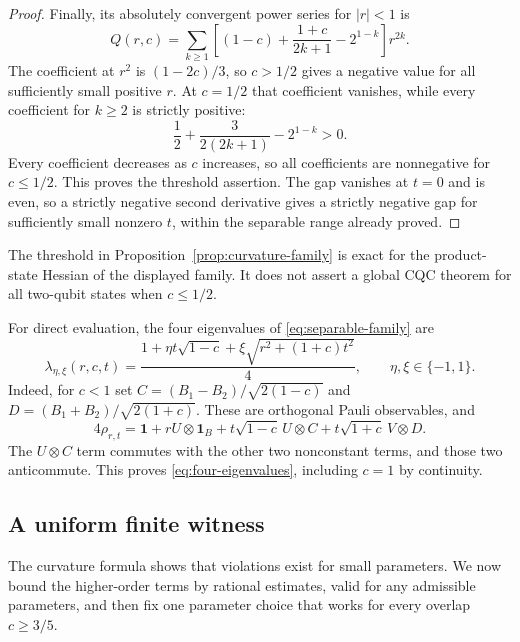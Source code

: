 \begin{proof}
 Finally, its absolutely convergent power series for $|r|<1$ is
 \begin{equation}
  Q(r,c)=\sum_{k\geq1}
   \left[(1-c)+\frac{1+c}{2k+1}-2^{1-k}\right]r^{2k}.
  \label{eq:curvature-series}
 \end{equation}
 The coefficient at $r^2$ is $(1-2c)/3$, so $c>1/2$ gives a negative
 value for all sufficiently small positive $r$.  At $c=1/2$ that
 coefficient vanishes, while every coefficient for $k\geq2$ is
 strictly positive:
 \[
  \frac12+\frac{3}{2(2k+1)}-2^{1-k}>0.
 \]
 Every coefficient decreases as $c$ increases, so all coefficients
 are nonnegative for $c\leq1/2$.  This proves the threshold assertion.
 The gap vanishes at $t=0$ and is even, so a strictly negative second
 derivative gives a strictly negative gap for sufficiently small
 nonzero $t$, within the separable range already proved.
\end{proof}

The threshold in Proposition~\ref{prop:curvature-family} is exact for
the product-state Hessian of the displayed family.  It does not assert
a global CQC theorem for all two-qubit states when $c\leq1/2$.

For direct evaluation, the four eigenvalues of
\eqref{eq:separable-family} are
\begin{equation}
 \lambda_{\eta,\xi}(r,c,t)
 =\frac{1+\eta t\sqrt{1-c}
             +\xi\sqrt{r^2+(1+c)t^2}}4,
 \qquad\eta,\xi\in\{-1,1\}.
 \label{eq:four-eigenvalues}
\end{equation}
Indeed, for $c<1$ set
$C=(B_1-B_2)/\sqrt{2(1-c)}$ and
$D=(B_1+B_2)/\sqrt{2(1+c)}$.  These are orthogonal Pauli
observables, and
\[
 4\rho_{r,t}=\mathbf1+rU\otimes\mathbf1_B
   +t\sqrt{1-c}\,U\otimes C+t\sqrt{1+c}\,V\otimes D.
\]
The $U\otimes C$ term commutes with the other two nonconstant terms,
and those two anticommute.  This proves
\eqref{eq:four-eigenvalues}, including $c=1$ by continuity.

\subsection{A uniform finite witness}
\label{sec:witness}

The curvature formula shows that violations exist for small parameters.
We now bound the higher-order terms by rational estimates, valid for any
admissible parameters, and then fix one parameter choice that works for
every overlap $c\geq3/5$.

